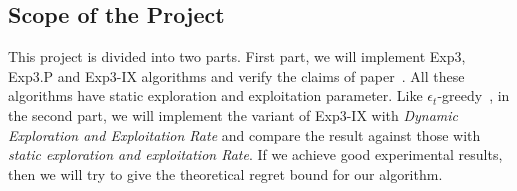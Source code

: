 \documentclass[a4paper, 11pt]{article}
\begin{document}
	\subsection*{Scope of the Project}
	This project is divided into two parts. First part, we will implement Exp3, Exp3.P and Exp3-IX algorithms and verify the claims of paper~\cite{neu2015explore}. All these algorithms have static exploration and exploitation parameter. Like $\epsilon_t$-greedy~\cite{auer2002finite}, in the second part, we will implement the variant of Exp3-IX with {\it Dynamic Exploration and Exploitation Rate} and compare the result against those with {\it static exploration and exploitation Rate}. If we achieve good experimental results, then we will try to give the theoretical regret bound for our algorithm.
	
	
	
	
\end{document}
